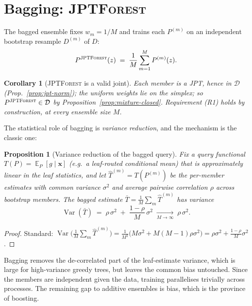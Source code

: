 \documentclass[11pt]{article}
\theoremstyle{plain}
\newtheorem{proposition}[theorem]{Proposition}
\newtheorem{corollary}[theorem]{Corollary}
\theoremstyle{definition}
\theoremstyle{remark}
\DeclareMathOperator{\E}{\mathbb{E}}
\DeclareMathOperator{\Var}{Var}
\newcommand{\Dens}{\mathcal{D}}
\newcommand{\jptforest}{\textsc{JPTForest}}
\begin{document}
\section{Bagging: \jptforest}
\label{sec:bagging}

The bagged ensemble fixes $w_m=1/M$ and trains each $P^{(m)}$ on an
independent bootstrap resample $D^{(m)}$ of $D$:
\begin{equation}
\label{eq:bag}
P^{\jptforest}(z)\;=\;\frac1M\sum_{m=1}^M P^{(m)}(z).
\end{equation}

\begin{corollary}[\jptforest{} is a valid joint]
\label{cor:bag-valid}
Each member is a JPT, hence in $\Dens$ (Prop.~\ref{prop:jpt-norm}); the
uniform weights lie on the simplex; so $P^{\jptforest}\in\Dens$ by
Proposition~\ref{prop:mixture-closed}. Requirement (R1) holds by
construction, at every ensemble size $M$.
\end{corollary}

The statistical role of bagging is \emph{variance reduction}, and the
mechanism is the classic one:

\begin{proposition}[Variance reduction of the bagged query]
\label{prop:bag-var}
Fix a query functional $T(P)=\E_P[g\mid\mathbf{x}]$ (e.g.\ a leaf-routed
conditional mean) that is approximately linear in the leaf statistics, and
let $\hat T^{(m)}=T(P^{(m)})$ be the per-member estimates with common
variance $\sigma^2$ and average pairwise correlation $\rho$ across
bootstrap members. The bagged estimate
$\bar T=\frac1M\sum_m \hat T^{(m)}$ has variance
\[
\Var(\bar T)\;=\;\rho\,\sigma^2 \;+\; \frac{1-\rho}{M}\,\sigma^2
\;\xrightarrow[M\to\infty]{}\; \rho\,\sigma^2 .
\]
\end{proposition}
\begin{proof}
Standard: $\Var\!\big(\frac1M\sum_m \hat T^{(m)}\big)=\frac1{M^2}
\big(M\sigma^2 + M(M-1)\rho\sigma^2\big)=\rho\sigma^2+\frac{1-\rho}{M}
\sigma^2$.
\end{proof}

Bagging removes the de-correlated part of the leaf-estimate variance,
which is large for high-variance greedy trees, but leaves the common bias
untouched. Since the members are independent given the data, training
parallelises trivially across processes. The remaining gap to additive
ensembles is bias, which is the province of boosting.
\end{document}
